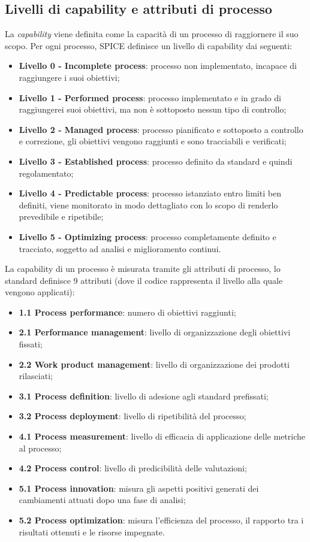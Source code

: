 \documentclass[a4paper]{article}
\begin{document}
\subsection{Livelli di capability e attributi di processo}
La \textit{capability} viene definita come la capacità di un processo di raggiornere il suo scopo.
Per ogni processo, SPICE definisce un livello di capability dai seguenti:
\begin{itemize}
  \item \textbf{Livello 0 - Incomplete process}: processo non implementato, incapace di raggiungere i suoi obiettivi;
  \item \textbf{Livello 1 - Performed process}: processo implementato e in grado di raggiungerei suoi obiettivi, ma non è sottoposto  nessun tipo di controllo; 
  \item \textbf{Livello 2 - Managed process}: processo pianificato e sottoposto a controllo e correzione, gli obiettivi vengono raggiunti e sono tracciabili e verificati;
  \item \textbf{Livello 3 - Established process}: processo definito da standard e quindi regolamentato;
  \item \textbf{Livello 4 - Predictable process}: processo istanziato entro limiti ben definiti, viene monitorato in modo dettagliato con lo scopo di renderlo prevedibile e ripetibile;
  \item \textbf{Livello 5 - Optimizing process}: processo completamente definito e tracciato, soggetto ad analisi e miglioramento continui.
\end{itemize}
La capability di un processo è misurata tramite gli attributi di processo, lo standard definisce 9 attributi (dove il codice rappresenta il livello alla quale vengono applicati):
\begin{itemize}
  \item \textbf{1.1 Process performance}: numero di obiettivi raggiunti;
  \item \textbf{2.1 Performance management}: livello di organizzazione degli obiettivi fissati;
  \item \textbf{2.2 Work product management}: livello di organizzazione dei prodotti rilasciati;
  \item \textbf{3.1 Process definition}: livello di adesione agli standard prefissati;
  \item \textbf{3.2 Process deployment}: livello di ripetibilità del processo;
  \item \textbf{4.1 Process measurement}: livello di efficacia di applicazione delle metriche al processo;
  \item \textbf{4.2 Process control}: livello di predicibilità delle valutazioni;
  \item \textbf{5.1 Process innovation}: misura gli aspetti positivi generati dei cambiamenti attuati dopo una fase di analisi;
  \item \textbf{5.2 Process optimization}: misura l'efficienza del processo, il rapporto tra i risultati ottenuti e le risorse impegnate.  
\end{itemize}
\end{document}
